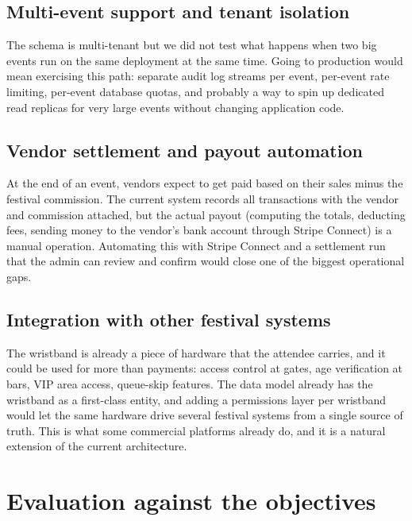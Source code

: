 \subsection{Multi-event support and tenant isolation}
\label{subsec:improvement-multi-event}

The schema is multi-tenant but we did not test what happens when two big events run on the same deployment at the same time. Going to production would mean exercising this path: separate audit log streams per event, per-event rate limiting, per-event database quotas, and probably a way to spin up dedicated read replicas for very large events without changing application code.

\subsection{Vendor settlement and payout automation}
\label{subsec:improvement-settlement}

At the end of an event, vendors expect to get paid based on their sales minus the festival commission. The current system records all transactions with the vendor and commission attached, but the actual payout (computing the totals, deducting fees, sending money to the vendor's bank account through Stripe Connect) is a manual operation. Automating this with Stripe Connect and a settlement run that the admin can review and confirm would close one of the biggest operational gaps.

\subsection{Integration with other festival systems}
\label{subsec:improvement-integrations}

The wristband is already a piece of hardware that the attendee carries, and it could be used for more than payments: access control at gates, age verification at bars, VIP area access, queue-skip features. The data model already has the wristband as a first-class entity, and adding a permissions layer per wristband would let the same hardware drive several festival systems from a single source of truth. This is what some commercial platforms already do, and it is a natural extension of the current architecture.

\section{Evaluation against the objectives}
\label{sec:evaluation}


